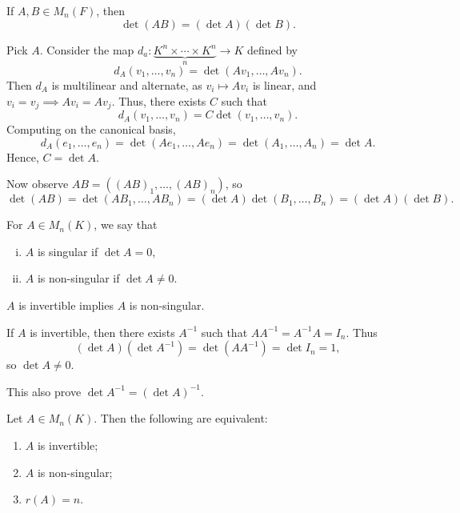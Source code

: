 \documentclass[12pt]{article}
\begin{document}
\begin{lemma}
	If $A, B \in M_{n}(F)$, then 
	\[
		\det (AB) = (\det A)(\det B)
	.\]
\end{lemma}

\begin{proofbox}
	Pick $A$. Consider the map $d_a : \underbrace{K^{n} \times \cdots \times K^{n}}_{n} \to K$ defined by
	\[
		d_A(v_1, \ldots, v_n) = \det(Av_1, \ldots, Av_n)
	.\]
	Then $d_A$ is multilinear and alternate, as $v_i \mapsto A v_i$ is linear, and $v_i = v_j \implies A v_i = A v_j$. Thus, there exists $C$ such that
	\[
		d_A(v_1, \ldots, v_n) = C \det(v_1, \ldots, v_n)
	.\]
	Computing on the canonical basis,
	\[
		d_A(e_1, \ldots, e_n) = \det(Ae_1, \ldots, Ae_n) = \det(A_1, \ldots, A_n) = \det A
	.\]
	Hence, $C = \det A$.

	Now observe $AB = ((AB)_1, \ldots, (AB)_n)$, so
	\[
		\det(AB) = \det(AB_1, \ldots, AB_n) = (\det A)\det(B_1, \ldots, B_n) = (\det A)(\det B)
	.\]
\end{proofbox}

\begin{definition}
	For $A \in M_n(K)$, we say that
	\begin{enumerate}[(i)]
		\item $A$ is singular if $\det A = 0$,
		\item $A$ is non-singular if $\det A \neq 0$.
	\end{enumerate}
\end{definition}

\begin{lemma}
	$A$ is invertible implies $A$ is non-singular.
\end{lemma}

\begin{proofbox}
	If $A$ is invertible, then there exists $A^{-1}$ such that $AA^{-1} = A^{-1}A = I_n$. Thus
	\[
		(\det A)(\det A^{-1}) = \det (AA^{-1}) = \det I_n = 1
	,\]
	so $\det A \neq 0$.
\end{proofbox}

\begin{remark}
	This also prove $\det A^{-1} = (\det A)^{-1}$.
\end{remark}

\begin{theorem}
	Let $A \in M_n(K)$. Then the following are equivalent:
	\begin{enumerate}[\normalfont(i)]
		\item $A$ is invertible;
		\item $A$ is non-singular;
		\item $r(A) = n$.
	\end{enumerate}
\end{theorem}
\end{document}
